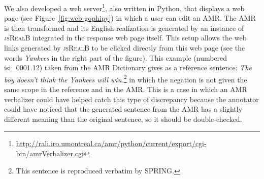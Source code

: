 \documentclass[12pt]{article}
\newcommand{\systeme}[1]{\textsc{#1}}
\newcommand{\jsr}{\systeme{jsRealB}}
\newcommand{\spring}{\systeme{SPRING}}
\newcommand{\representation}[1]{\textsf{#1}}
\newcommand{\AMR}{\representation{AMR}}
\begin{document}
We also developed a web server\footnote{\url{http://rali.iro.umontreal.ca/amr/python/current/export/cgi-bin/amrVerbalizer.cgi}}, also written in Python, that displays a web page (see Figure~\ref{fig:web-gophipy}) in which a user can edit an AMR. The AMR is then transformed and its English realization is generated by an instance of \jsr{} integrated in the response web page itself. This setup allows the web links generated by \jsr{} to be clicked directly from this web page (see the words \emph{Yankees} in the right part of the figure). This example (numbered isi\_0001.12) taken from the AMR Dictionary gives as a reference sentence: \emph{The boy doesn't think the Yankees will win.}\footnote{This sentence is reproduced verbatim by \spring{}.} in which the negation is not given the same scope in the reference and in the \AMR{}. This is a case in which an \AMR{} verbalizer could have helped catch this type of discrepancy because the annotator could have noticed that the generated sentence from the \AMR{} has a slightly different meaning than the original sentence, so it should be double-checked.
\end{document}
